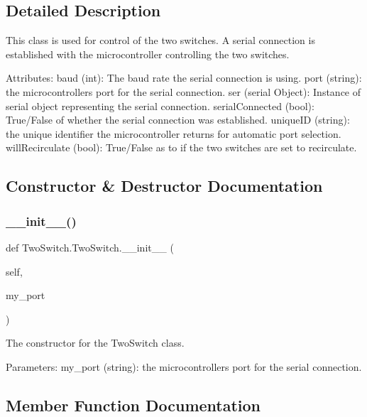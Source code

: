 \subsection{Detailed Description}
\begin{DoxyVerb}This class is used for control of the two switches. A serial connection is established with the microcontroller controlling the two switches.

Attributes:
    baud (int): The baud rate the serial connection is using.
    port (string): the microcontrollers port for the serial connection.
    ser (serial Object): Instance of serial object representing the serial connection.
    serialConnected (bool): True/False of whether the serial connection was established.
    uniqueID (string): the unique identifier the microcontroller returns for automatic port selection.
    willRecirculate (bool): True/False as to if the two switches are set to recirculate.
\end{DoxyVerb}
 

\subsection{Constructor \& Destructor Documentation}
\mbox{\label{class_two_switch_1_1_two_switch_a762f6622ca527b12104b0593378f87fb}} 
\subsubsection{\texorpdfstring{\_\_init\_\_()}{\_\_init\_\_()}}
{\footnotesize\ttfamily def Two\+Switch.\+Two\+Switch.\+\_\+\+\_\+init\+\_\+\+\_\+ (\begin{DoxyParamCaption}\item[{}]{self,  }\item[{}]{my\+\_\+port }\end{DoxyParamCaption})}

\begin{DoxyVerb}The constructor for the TwoSwitch class.

Parameters:
    my_port (string): the microcontrollers port for the serial connection.
\end{DoxyVerb}
 

\subsection{Member Function Documentation}
\mbox{\label{class_two_switch_1_1_two_switch_a99d8b3d50bedbf126e1fbe10506e501f}} 
